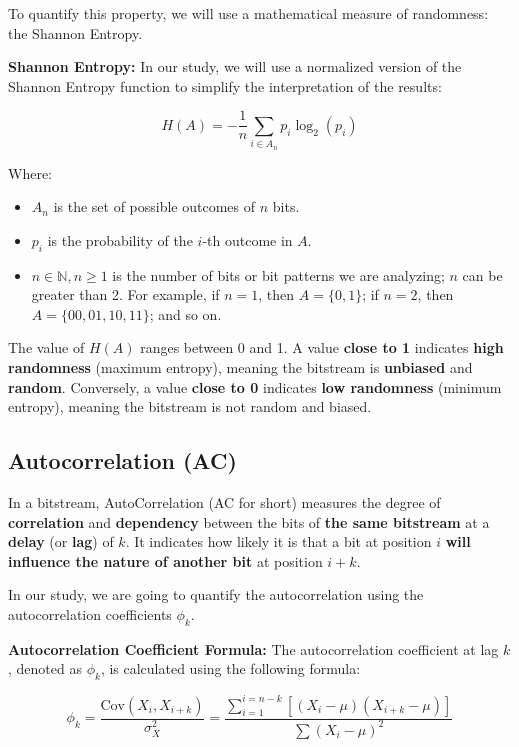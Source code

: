 To quantify this property, we will use a mathematical measure of randomness: the Shannon Entropy.

\textbf{Shannon Entropy:}  
In our study, we will use a normalized version of the Shannon Entropy function to simplify the interpretation of the results:

\begin{equation}
H(A) = - \frac{1}{n} \sum_{i \in A_n} p_i \log_2 (p_i)
\end{equation}

Where:
\begin{itemize}
    \item \( A_n \) is the set of possible outcomes of \( n \) bits.
    \item \( p_i \) is the probability of the \( i \)-th outcome in \( A \).
    \item \( n \in \mathbb{N}, n \geq 1 \) is the number of bits or bit patterns we are analyzing; \( n \) can be greater than 2.  
    For example, if \( n=1 \), then \( A = \{ 0, 1 \} \); if \( n=2 \), then \( A = \{ 00, 01, 10, 11 \} \); and so on.
\end{itemize}

The value of \( H(A) \) ranges between 0 and 1. 
A value \textbf{close to 1} indicates \textbf{high randomness} (maximum entropy), meaning the bitstream is \textbf{unbiased} and \textbf{random}. Conversely, a value \textbf{close to 0} indicates \textbf{low randomness} (minimum entropy), meaning the bitstream is not random and biased.


\subsection{Autocorrelation (AC)}  
In a bitstream, AutoCorrelation (AC for short) measures the degree of \textbf{correlation} and \textbf{dependency} between the bits of \textbf{the same bitstream} at a \textbf{delay} (or \textbf{lag}) of \( k \).  
It indicates how likely it is that a bit at position \( i \) \textbf{will influence the nature of another bit} at position \( i+k \).

In our study, we are going to quantify the autocorrelation using the autocorrelation coefficients \( \phi_k \).

\textbf{Autocorrelation Coefficient Formula:}  
The autocorrelation coefficient at lag \( k \), denoted as \( \phi_k \), is calculated using the following formula:


\begin{equation}
\phi_k = \frac{\text{Cov}(X_i, X_{i+k})}{\sigma_X^2} = \frac{\sum_{i=1}^{i = n - k}[(X_i - \mu)(X_{i+k} - \mu)]}{\sum (X_i - \mu)^2}
\end{equation}

